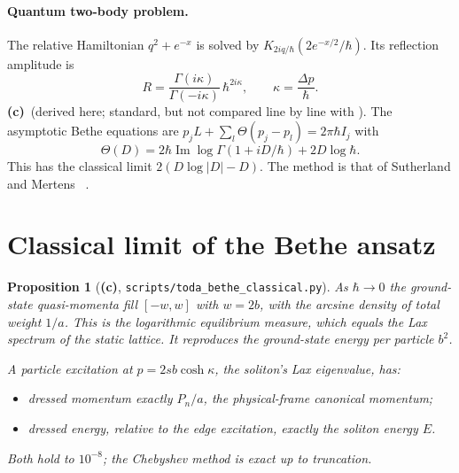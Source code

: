 \documentclass[11pt,a4paper]{article}
\newcommand{\Lc}{\textsf{\textbf{(c)}}}\newcommand{\Ld}{\textsf{\textbf{(d)}}}
\newcommand{\script}[1]{\texttt{scripts/#1}}
\newtheorem{proposition}{Proposition}\theoremstyle{remark}\newtheorem{remark}{Remark}
\begin{document}
\paragraph{Quantum two-body problem.} The relative Hamiltonian $q^2+e^{-x}$ is solved by $K_{2iq/\hbar}(2e^{-x/2}/\hbar)$. Its reflection amplitude is
\[
R=\frac{\Gamma(i\kappa)}{\Gamma(-i\kappa)}\,\hbar^{2i\kappa},\qquad \kappa=\frac{\Delta p}{\hbar}.
\]
\Lc\ (derived here; standard, but not compared line by line with \cite{Gutzwiller,Sklyanin}). The asymptotic Bethe equations are $p_jL+\sum_l\Theta(p_j-p_l)=2\pi\hbar I_j$ with
\[
\Theta(D)=2\hbar\operatorname{Im}\log\Gamma(1+iD/\hbar)+2D\log\hbar .
\]
This has the classical limit $2(D\log|D|-D)$. The method is that of Sutherland and Mertens \Lb~\cite{Sutherland,Mertens}.

\section{Classical limit of the Bethe ansatz}

\begin{proposition}[\Lc, \script{toda\_bethe\_classical.py}]
As $\hbar\to0$ the ground-state quasi-momenta fill $[-w,w]$ with $w=2b$, with the arcsine density of total weight $1/a$. This is the logarithmic equilibrium measure, which equals the Lax spectrum of the static lattice. It reproduces the ground-state energy per particle $b^2$.

A particle excitation at $p=2sb\cosh\kappa$, the soliton's Lax eigenvalue, has:
\begin{itemize}
\item dressed momentum exactly $P_n/a$, the physical-frame canonical momentum;
\item dressed energy, relative to the edge excitation, exactly the soliton energy $E$.
\end{itemize}
Both hold to $10^{-8}$; the Chebyshev method is exact up to truncation.
\end{proposition}
\end{document}
